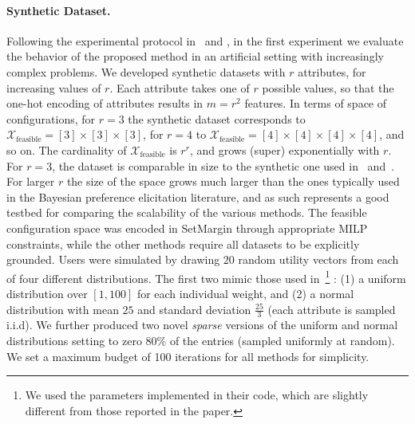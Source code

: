 \documentclass{article}
\renewcommand\[{\begin{equation}}
\renewcommand\]{\end{equation}}
\newcommand{\calvar}[1]{\ensuremath{\mathcal{#1}}}
\newcommand{\calX}{\calvar{X}}
\begin{document}
\paragraph{Synthetic Dataset.} Following the experimental protocol
in~\cite{guo2010real} and \cite{viappiani2010optimal}, in the first
experiment we evaluate the behavior of the proposed method in an
artificial setting with increasingly complex problems. We developed
synthetic datasets with $r$ attributes, for increasing values of $r$.
Each attribute takes one of $r$ possible values, so that the one-hot
encoding of attributes results in $m=r^2$ features. In terms of space
of configurations, for $r=3$ the synthetic dataset corresponds to 
$\calX_\text{feasible} = [3] \times [3] \times [3]$, for $r=4$ to
$\calX_\text{feasible} = [4] \times [4] \times [4] \times [4]$, and so on. The
cardinality of $\calX_\text{feasible}$ is $r^r$, and grows (super)
exponentially with $r$.
For $r=3$, the dataset is comparable in size to the synthetic one used
in~\cite{guo2010real} and~\cite{viappiani2010optimal}.
For larger $r$ the size of the space grows much larger than the ones
typically used in the Bayesian preference elicitation literature, and
as such represents a good testbed for comparing the scalability of the
various methods. The feasible configuration space was encoded in {\sc
  SetMargin} through appropriate MILP constraints, while the other
methods require all datasets to be explicitly grounded.  Users were
simulated by drawing $20$ random utility vectors from each of four
different distributions. The first two mimic those used
in~\cite{guo2010real}\footnote{We used the parameters implemented in their code, which are slightly different from those reported in the paper.}%
: (1) a uniform distribution over $[1, 100]$ for each
individual weight, and (2) a normal distribution with mean $25$
and %
standard deviation $\frac{25}{3}$ (each attribute is sampled i.i.d).
We further produced two novel {\em sparse} versions of the uniform and
normal distributions setting to zero $80\%$ of the entries (sampled
uniformly at random). We set a maximum budget of 100 iterations for all
methods for simplicity.
\end{document}
